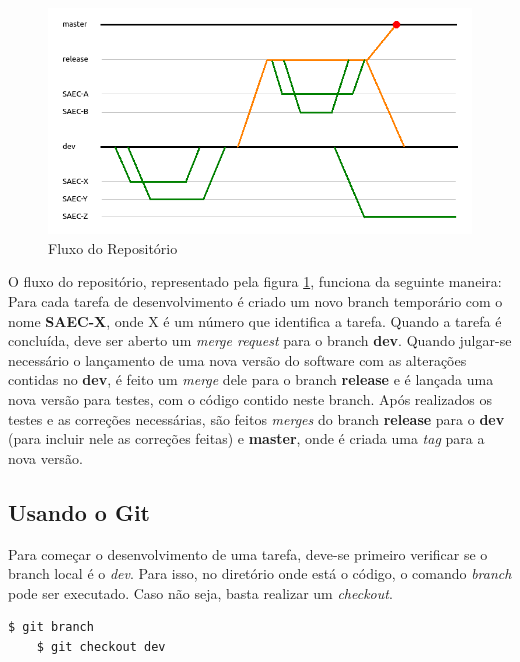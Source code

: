 \begin{figure}[h]
  \begin{center}
    \includegraphics[scale=0.58]{images/git.png}
    \caption{Fluxo do Repositório}
    \label{fig:fluxobranches}
  \end{center}
\end{figure}

\vspace{5mm}

O fluxo do repositório, representado pela figura \ref{fig:fluxobranches}, funciona da seguinte maneira: Para cada tarefa de desenvolvimento é criado um novo branch temporário com o nome \textbf{SAEC-X}, onde X é um número que identifica a tarefa. Quando a tarefa é concluída, deve ser aberto um \textit{merge request} para o branch \textbf{dev}. Quando julgar-se necessário o lançamento de uma nova versão do software com as alterações contidas no \textbf{dev}, é feito um \textit{merge} dele para o branch \textbf{release} e é lançada uma nova versão para testes, com o código contido neste branch. Após realizados os testes e as correções necessárias, são feitos \textit{merges} do branch \textbf{release} para o \textbf{dev} (para incluir nele as correções feitas) e \textbf{master}, onde é criada uma \textit{tag} para a nova versão.

\subsection{Usando o Git}

Para começar o desenvolvimento de uma tarefa, deve-se primeiro verificar se o branch local é o \textit{dev}. Para isso, no diretório onde está o código, o comando \textit{branch} pode ser executado. Caso não seja, basta realizar um \textit{checkout}.

\begin{lstlisting}[language=bash]
    $ git branch
    $ git checkout dev
\end{lstlisting}

